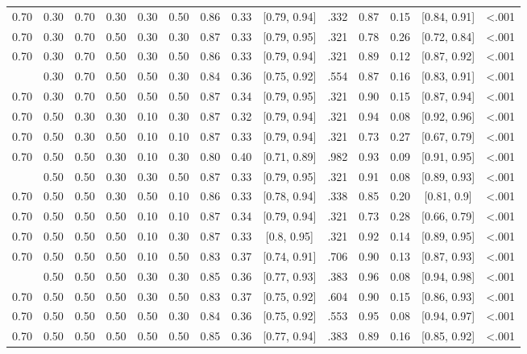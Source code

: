 \documentclass[
  11pt,
]{article}
\begin{document}
\begin{landscape}
\begin{ThreePartTable}
\begin{longtable}[t]{cccccccccccccc}
0.70 & 0.30 & 0.70 & 0.30 & 0.30 & 0.50 & 0.86 & 0.33 & {}[0.79, 0.94] & .332 & 0.87 & 0.15 & {}[0.84, 0.91] & <.001\\
0.70 & 0.30 & 0.70 & 0.50 & 0.30 & 0.30 & 0.87 & 0.33 & {}[0.79, 0.95] & .321 & 0.78 & 0.26 & {}[0.72, 0.84] & <.001\\
0.70 & 0.30 & 0.70 & 0.50 & 0.30 & 0.50 & 0.86 & 0.33 & {}[0.79, 0.94] & .321 & 0.89 & 0.12 & {}[0.87, 0.92] & <.001\\
\addlinespace
0.70 & 0.30 & 0.70 & 0.50 & 0.50 & 0.30 & 0.84 & 0.36 & {}[0.75, 0.92] & .554 & 0.87 & 0.16 & {}[0.83, 0.91] & <.001\\
0.70 & 0.30 & 0.70 & 0.50 & 0.50 & 0.50 & 0.87 & 0.34 & {}[0.79, 0.95] & .321 & 0.90 & 0.15 & {}[0.87, 0.94] & <.001\\
0.70 & 0.50 & 0.30 & 0.30 & 0.10 & 0.30 & 0.87 & 0.32 & {}[0.79, 0.94] & .321 & 0.94 & 0.08 & {}[0.92, 0.96] & <.001\\
0.70 & 0.50 & 0.30 & 0.50 & 0.10 & 0.10 & 0.87 & 0.33 & {}[0.79, 0.94] & .321 & 0.73 & 0.27 & {}[0.67, 0.79] & <.001\\
0.70 & 0.50 & 0.50 & 0.30 & 0.10 & 0.30 & 0.80 & 0.40 & {}[0.71, 0.89] & .982 & 0.93 & 0.09 & {}[0.91, 0.95] & <.001\\
\addlinespace
0.70 & 0.50 & 0.50 & 0.30 & 0.30 & 0.50 & 0.87 & 0.33 & {}[0.79, 0.95] & .321 & 0.91 & 0.08 & {}[0.89, 0.93] & <.001\\
0.70 & 0.50 & 0.50 & 0.30 & 0.50 & 0.10 & 0.86 & 0.33 & {}[0.78, 0.94] & .338 & 0.85 & 0.20 & {}[0.81, 0.9] & <.001\\
0.70 & 0.50 & 0.50 & 0.50 & 0.10 & 0.10 & 0.87 & 0.34 & {}[0.79, 0.94] & .321 & 0.73 & 0.28 & {}[0.66, 0.79] & <.001\\
0.70 & 0.50 & 0.50 & 0.50 & 0.10 & 0.30 & 0.87 & 0.33 & {}[0.8, 0.95] & .321 & 0.92 & 0.14 & {}[0.89, 0.95] & <.001\\
0.70 & 0.50 & 0.50 & 0.50 & 0.10 & 0.50 & 0.83 & 0.37 & {}[0.74, 0.91] & .706 & 0.90 & 0.13 & {}[0.87, 0.93] & <.001\\
\addlinespace
0.70 & 0.50 & 0.50 & 0.50 & 0.30 & 0.30 & 0.85 & 0.36 & {}[0.77, 0.93] & .383 & 0.96 & 0.08 & {}[0.94, 0.98] & <.001\\
0.70 & 0.50 & 0.50 & 0.50 & 0.30 & 0.50 & 0.83 & 0.37 & {}[0.75, 0.92] & .604 & 0.90 & 0.15 & {}[0.86, 0.93] & <.001\\
0.70 & 0.50 & 0.50 & 0.50 & 0.50 & 0.30 & 0.84 & 0.36 & {}[0.75, 0.92] & .553 & 0.95 & 0.08 & {}[0.94, 0.97] & <.001\\
0.70 & 0.50 & 0.50 & 0.50 & 0.50 & 0.50 & 0.85 & 0.36 & {}[0.77, 0.94] & .383 & 0.89 & 0.16 & {}[0.85, 0.92] & <.001\\

\end{longtable}
\end{ThreePartTable}
\end{landscape}
\end{document}
